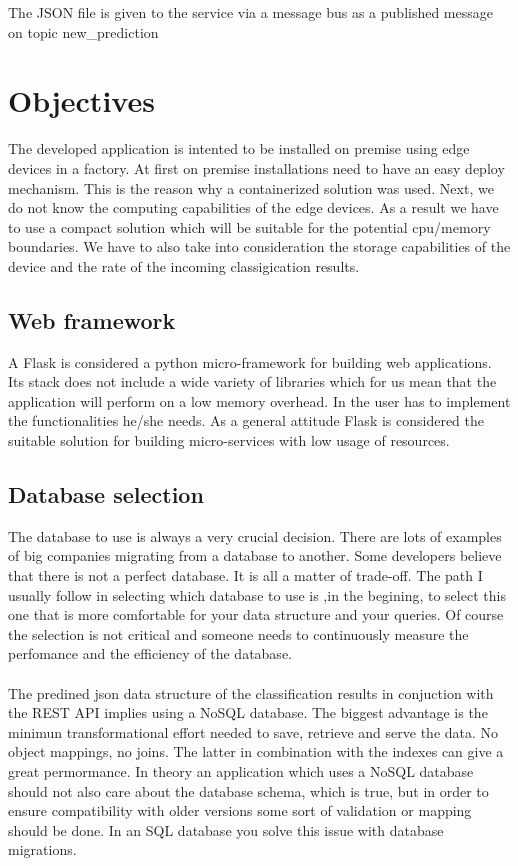 \documentclass[a4paper,10pt]{article}
\begin{document}
The JSON file is given to the service via a message bus as a published message on
topic new\_prediction

\section{Objectives}
The developed application is intented to be installed on premise using edge devices
in a factory. At first on premise installations need to have an easy deploy mechanism. This
is the reason why a containerized solution was used. Next, we do not know the computing
capabilities of the edge devices. As a result we have to use a compact solution which
will be suitable for the potential cpu/memory boundaries. We have to also take into
consideration the storage capabilities of the device and the rate of the incoming
classigication results.
\subsection{Web framework}
A Flask is considered a python micro-framework for building web applications. Its stack
does not include a wide variety of libraries which for us mean that the application will
perform on a low memory overhead. In the user has to implement the functionalities he/she needs.
As a general attitude Flask is considered the suitable solution for building micro-services with
low usage of resources.

\subsection{Database selection}
The database to use is always a very crucial decision. There are lots of examples of
big companies migrating from a database to another. Some developers believe that there
is not a perfect database. It is all a matter of trade-off. The path I usually follow
in selecting which database to use is ,in the begining, to select this one that is more
comfortable for your data structure and your queries. Of course the selection is not
critical and someone needs to continuously measure the perfomance and the efficiency
of the database.\\
\\
The predined json data structure of the classification results in conjuction with the REST API
implies using a NoSQL database. The biggest advantage is the minimun transformational effort
needed to save, retrieve and serve the data. No object mappings, no joins. The latter in
combination with the indexes can give a great permormance. In theory an application which
uses a NoSQL database should not also care about the database schema, which is true, but
in order to ensure compatibility with older versions some sort of validation or mapping should be done.
In an SQL database you solve this issue with database migrations.
\end{document}
